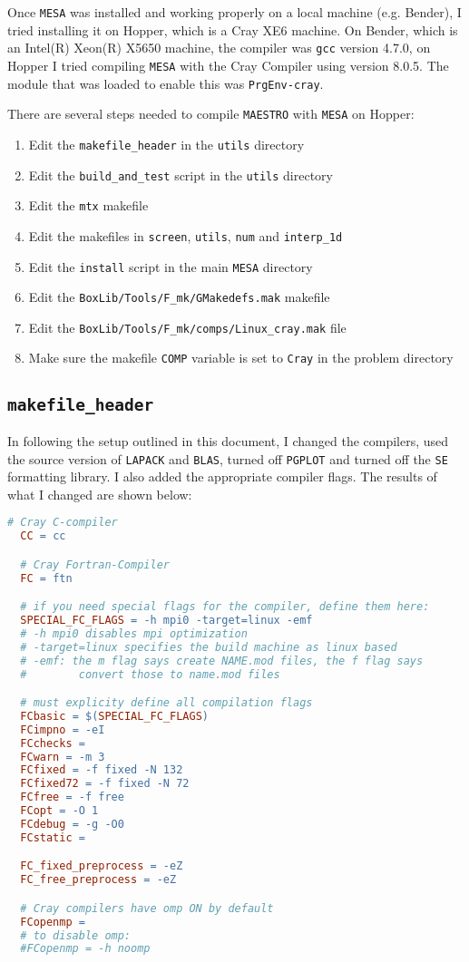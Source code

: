 
Once {\tt MESA} was installed and working properly on a local machine (e.g. 
Bender), I tried installing it on Hopper, which is a Cray XE6 machine. On 
Bender, which is an Intel(R) Xeon(R) X5650 machine, the compiler was 
{\tt gcc} version 4.7.0, on Hopper I tried compiling {\tt MESA} with the 
Cray Compiler using version 8.0.5. The module that was loaded to enable this 
was {\tt PrgEnv-cray}.

There are several steps needed to compile {\tt MAESTRO} with {\tt MESA} on 
Hopper:
\begin{enumerate}
\item Edit the {\tt makefile\_header} in the {\tt utils} directory
\item Edit the {\tt build\_and\_test} script in the {\tt utils} directory
\item Edit the {\tt mtx} makefile
\item Edit the makefiles in {\tt screen}, {\tt utils}, {\tt num} and 
{\tt interp\_1d}
\item Edit the {\tt install} script in the main {\tt MESA} directory
\item Edit the {\tt BoxLib/Tools/F\_mk/GMakedefs.mak} makefile
\item Edit the {\tt BoxLib/Tools/F\_mk/comps/Linux\_cray.mak} file
\item Make sure the makefile {\tt COMP} variable is set to {\tt Cray} in the 
problem directory
\end{enumerate}

\subsection{{\tt makefile\_header}}
In following the setup outlined in this document, I changed the compilers, 
used the source version of {\tt LAPACK} and {\tt BLAS}, turned off 
{\tt PGPLOT} and turned off the {\tt SE} formatting library. I also added the 
appropriate compiler flags. The results of what I changed are shown below:
\begin{lstlisting}[language=make,mathescape=false]
  # Cray C-compiler
  CC = cc

  # Cray Fortran-Compiler
  FC = ftn

  # if you need special flags for the compiler, define them here:
  SPECIAL_FC_FLAGS = -h mpi0 -target=linux -emf
  # -h mpi0 disables mpi optimization
  # -target=linux specifies the build machine as linux based
  # -emf: the m flag says create NAME.mod files, the f flag says
  #        convert those to name.mod files

  # must explicity define all compilation flags
  FCbasic = $(SPECIAL_FC_FLAGS)
  FCimpno = -eI
  FCchecks =
  FCwarn = -m 3
  FCfixed = -f fixed -N 132
  FCfixed72 = -f fixed -N 72
  FCfree = -f free
  FCopt = -O 1
  FCdebug = -g -O0
  FCstatic =

  FC_fixed_preprocess = -eZ
  FC_free_preprocess = -eZ

  # Cray compilers have omp ON by default
  FCopenmp =
  # to disable omp:
  #FCopenmp = -h noomp 
\end{lstlisting}

